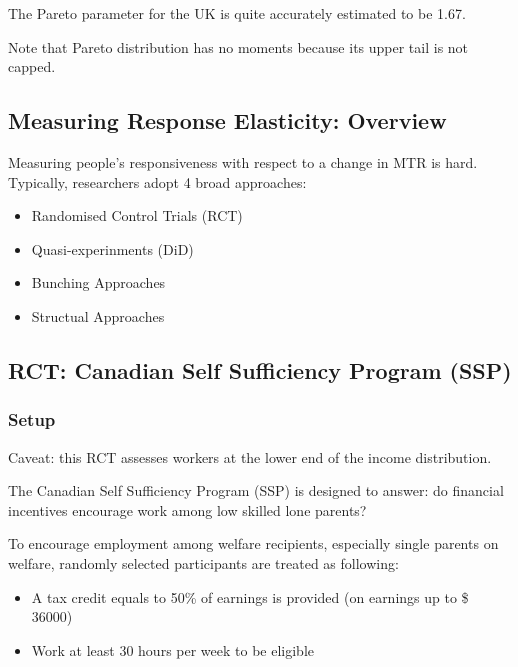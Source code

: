             The Pareto parameter for the UK is quite accurately estimated to be 1.67.

            Note that Pareto distribution has no moments because its upper tail is not capped.

        \subsection{Measuring Response Elasticity: Overview}

            Measuring people's responsiveness with respect to a change in MTR is hard. Typically, researchers adopt 4 broad approaches:
            \begin{itemize}
                \item Randomised Control Trials (RCT)
                \item Quasi-experinments (DiD)
                \item Bunching Approaches
                \item Structual Approaches
            \end{itemize}

        \subsection{RCT: Canadian Self Sufficiency Program (SSP)}

            \subsubsection{Setup}

                Caveat: this RCT assesses workers at the lower end of the income distribution.

                The Canadian Self Sufficiency Program (SSP) is designed to answer: do financial incentives encourage work among low skilled lone parents?

                To encourage employment among welfare recipients, especially single parents on welfare, randomly selected participants are treated as following:
                \begin{itemize}
                    \item A tax credit equals to 50\% of earnings is provided (on earnings up to \$ 36000)
                    \item Work at least 30 hours per week to be eligible
                \end{itemize}

